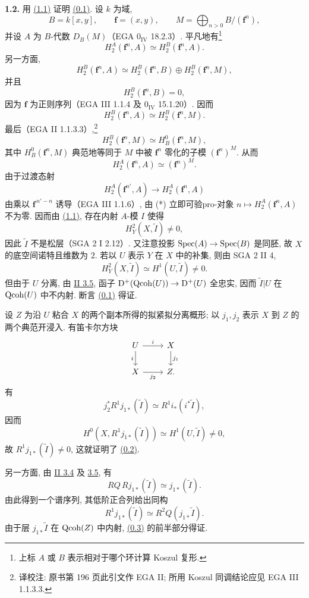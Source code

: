 \textbf{1.2.} 用 \hyperlink{sga6.e02.lem.1-1}{(1.1)} 证明 \hyperlink{sga6.e02.para.0-1}{(0.1)}. 设 $k$ 为域,
\[
 B=k[x,y],\qquad \mathbf f=(x,y),\qquad
 M=\bigoplus_{n>0}B/(\mathbf f^n),
\]
并设 $A$ 为 $B$-代数 $D_B(M)$（EGA $0_{\mathrm{IV}}$ 18.2.3）. 平凡地有\footnote{上标 $A$ 或 $B$ 表示相对于哪个环计算 Koszul 复形.}
\[
 H_2^A(\mathbf f^n,A)\simeq H_2^B(\mathbf f^n,A).
\]
另一方面,
\[
 H_2^B(\mathbf f^n,A)\simeq H_2^B(\mathbf f^n,B)\oplus H_2^B(\mathbf f^n,M),
\]
并且
\[
 H_2^B(\mathbf f^n,B)=0,
\]
因为 $\mathbf f$ 为正则序列（EGA III 1.1.4 及 $0_{\mathrm{IV}}$ 15.1.20）. 因而
\[
 H_2^B(\mathbf f^n,A)\simeq H_2^B(\mathbf f^n,M).
\]
最后（EGA II 1.1.3.3）,\footnote{译校注: 原书第 196 页此引文作 EGA II; 所用 Koszul 同调结论应见 EGA III 1.1.3.3.}
\[
 H_2^B(\mathbf f^n,M)\simeq H_B^0(\mathbf f^n,M),
\]
其中 $H_B^0(\mathbf f^n,M)$ 典范地等同于 $M$ 中被 $\mathbf f^n$ 零化的子模 $(\mathbf f^n)^M$. 从而
\begin{equation}\tag{*}
 H_2^A(\mathbf f^n,A)\simeq (\mathbf f^n)^M.
\end{equation}
由于过渡态射
\[
 H_2^A(\mathbf f^{n'},A)\longrightarrow H_2^A(\mathbf f^n,A)
\]
由乘以 $\mathbf f^{\,n'-n}$ 诱导（EGA III 1.1.6）, 由 (*) 立即可验pro-对象 $n\mapsto H_2^A(\mathbf f^n,A)$ 不为零. 因而由 \hyperlink{sga6.e02.lem.1-1}{(1.1)}, 存在内射 $A$-模 $I$ 使得
\[
 H^2_Y(X,\widetilde I)\ne0,
\]
因此 $\widetilde I$ 不是松层（SGA 2 I 2.12）. 又注意投影 $\operatorname{Spec}(A)\to\operatorname{Spec}(B)$ 是同胚, 故 $X$ 的底空间诺特且维数为 $2$. 若以 $U$ 表示 $Y$ 在 $X$ 中的补集, 则由 SGA 2 II 4,
\[
  H^2_Y(X,\widetilde I)\simeq H^1(U,\widetilde I)\ne0.
\]
但由于 $U$ 分离, 由 \hyperlink{sga6.e02.prop.3-5}{II 3.5}, 函子 $\mathrm D^+(\operatorname{Qcoh}(U))\to\mathrm D^+(U)$ 全忠实, 因而 $\widetilde I|U$ 在 $\operatorname{Qcoh}(U)$ 中不内射. 断言 \hyperlink{sga6.e02.para.0-1}{(0.1)} 得证.

设 $Z$ 为沿 $U$ 粘合 $X$ 的两个副本所得的拟紧拟分离概形; 以 $j_1,j_2$ 表示 $X$ 到 $Z$ 的两个典范开浸入. 有笛卡尔方块
\[
\begin{tikzcd}
 U \arrow[r,"i"] \arrow[d,"i"'] & X \arrow[d,"j_1"]\\
 X \arrow[r,"j_2"'] & Z .
\end{tikzcd}
\]
有
\[
 j_2^*R^1j_{1*}(\widetilde I)\simeq R^1i_*(i^*\widetilde I),
\]
因而
\[
 H^0(X,R^1j_{1*}(\widetilde I))\simeq H^1(U,\widetilde I)\ne0,
\]
故 $R^1j_{1*}(\widetilde I)\ne0$, 这就证明了 \hyperlink{sga6.e02.para.0-2}{(0.2)}.

另一方面, 由 \hyperlink{sga6.e02.lem.3-4}{II 3.4} 及 \hyperlink{sga6.e02.prop.3-5}{3.5}, 有
\[
 RQ\,Rj_{1*}(\widetilde I)\simeq j_{1*}(\widetilde I).
\]
由此得到一个谱序列, 其低阶正合列给出同构
\[
 R^1j_{1*}(\widetilde I)\simeq R^2Q(j_{1*}\widetilde I).
\]
由于层 $j_{1*}\widetilde I$ 在 $\operatorname{Qcoh}(Z)$ 中内射, \hyperlink{sga6.e02.para.0-3}{(0.3)} 的前半部分得证.

